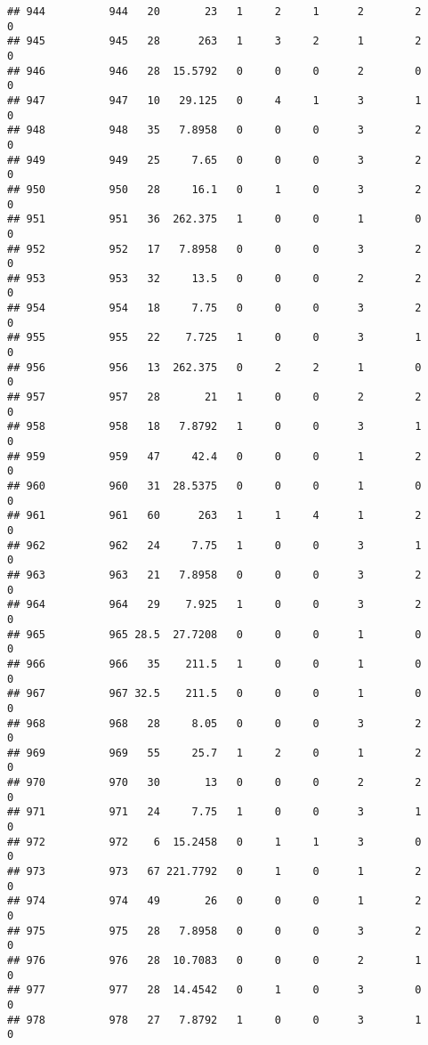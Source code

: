 \documentclass[
]{article}
\begin{document}
\begin{verbatim}
## 944          944   20       23   1     2     1      2        2         0
## 945          945   28      263   1     3     2      1        2         0
## 946          946   28  15.5792   0     0     0      2        0         0
## 947          947   10   29.125   0     4     1      3        1         0
## 948          948   35   7.8958   0     0     0      3        2         0
## 949          949   25     7.65   0     0     0      3        2         0
## 950          950   28     16.1   0     1     0      3        2         0
## 951          951   36  262.375   1     0     0      1        0         0
## 952          952   17   7.8958   0     0     0      3        2         0
## 953          953   32     13.5   0     0     0      2        2         0
## 954          954   18     7.75   0     0     0      3        2         0
## 955          955   22    7.725   1     0     0      3        1         0
## 956          956   13  262.375   0     2     2      1        0         0
## 957          957   28       21   1     0     0      2        2         0
## 958          958   18   7.8792   1     0     0      3        1         0
## 959          959   47     42.4   0     0     0      1        2         0
## 960          960   31  28.5375   0     0     0      1        0         0
## 961          961   60      263   1     1     4      1        2         0
## 962          962   24     7.75   1     0     0      3        1         0
## 963          963   21   7.8958   0     0     0      3        2         0
## 964          964   29    7.925   1     0     0      3        2         0
## 965          965 28.5  27.7208   0     0     0      1        0         0
## 966          966   35    211.5   1     0     0      1        0         0
## 967          967 32.5    211.5   0     0     0      1        0         0
## 968          968   28     8.05   0     0     0      3        2         0
## 969          969   55     25.7   1     2     0      1        2         0
## 970          970   30       13   0     0     0      2        2         0
## 971          971   24     7.75   1     0     0      3        1         0
## 972          972    6  15.2458   0     1     1      3        0         0
## 973          973   67 221.7792   0     1     0      1        2         0
## 974          974   49       26   0     0     0      1        2         0
## 975          975   28   7.8958   0     0     0      3        2         0
## 976          976   28  10.7083   0     0     0      2        1         0
## 977          977   28  14.4542   0     1     0      3        0         0
## 978          978   27   7.8792   1     0     0      3        1         0

\end{verbatim}
\end{document}
